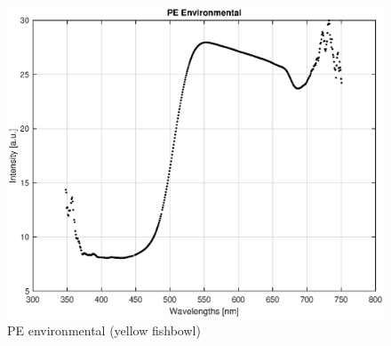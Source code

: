 \begin{appendices}

\begin{figure}
    \centering
    \includegraphics[width = 12cm]{Images/appendix/p-env_yellowbowl.eps}
    \caption{PE environmental (yellow fishbowl)}
    \label{fig:pe_env}
\end{figure}


\end{appendices}
